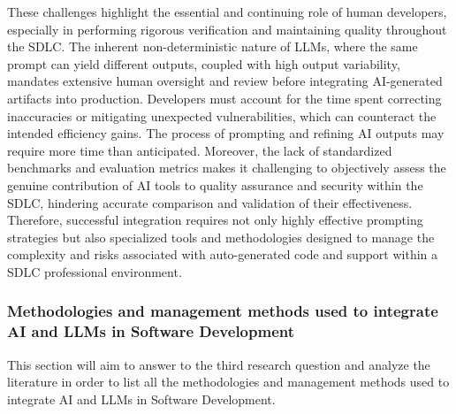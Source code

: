 These challenges highlight the essential and continuing role of human developers, especially in performing rigorous verification and maintaining quality throughout the SDLC. The inherent non-deterministic nature of LLMs, where the same prompt can yield different outputs, coupled with high output variability, mandates extensive human oversight and review before integrating AI-generated artifacts into production. Developers must account for the time spent correcting inaccuracies or mitigating unexpected vulnerabilities, which can counteract the intended efficiency gains. The process of prompting and refining AI outputs may require more time than anticipated. Moreover, the lack of standardized benchmarks and evaluation metrics makes it challenging to objectively assess the genuine contribution of AI tools to quality assurance and security within the SDLC, hindering accurate comparison and validation of their effectiveness. Therefore, successful integration requires not only highly effective prompting strategies but also specialized tools and methodologies designed to manage the complexity and risks associated with auto-generated code and support within a SDLC professional environment.

\subsubsection{Methodologies and management methods used to integrate AI and LLMs in Software Development}

This section will aim to answer to the third research question and analyze the literature in order to list all the methodologies and management methods used to integrate AI and LLMs in Software Development.

